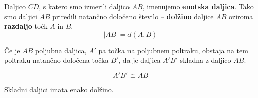 \begin{aksiom}
\begin{figure}[H]
        \end{figure}
    \end{aksiom}

        Daljico $CD$, s katero smo izmerili daljico $AB$, imenujemo \textbf{enotska daljica}.
        Tako smo daljici $AB$ priredili natančno določeno število -- \textbf{dolžino} daljice $AB$ oziroma \textbf{razdaljo} točk $A$ in $B$.
        $$ |AB|=d(A,B)$$
    

    





    \begin{aksiom}
        Če je $AB$ poljubna daljica, $A'$ pa točka na poljubnem poltraku, obstaja na tem poltraku natančno določena točka $B'$,
        da je daljica $A'B'$ skladna z daljico $AB$.

        $$A'B'\cong AB$$
    \end{aksiom}

    \begin{izrek}
        Skladni daljici imata enako dolžino.
    \end{izrek}

    ~ 

